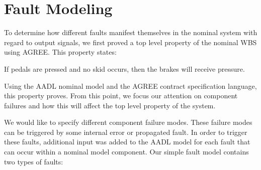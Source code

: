 \section{Fault Modeling}

To determine how different faults manifest themselves in the nominal system with regard to output signals, we first proved a top level property of the nominal WBS using AGREE. This property states: \\

\begin{tt}
If pedals are pressed and no skid occurs, then the brakes will receive pressure. \\
\end{tt}

Using the AADL nominal model and the AGREE contract specification language, this property proves. From this point, we focus our attention on component failures and how this will affect the top level property of the system. 

We would like to specify different component failure modes. These failure modes can be triggered by some internal error or propagated fault. In order to trigger these faults, additional input was added to the AADL model for each fault that can occur within a nominal model component. Our simple fault model contains two types of faults:

